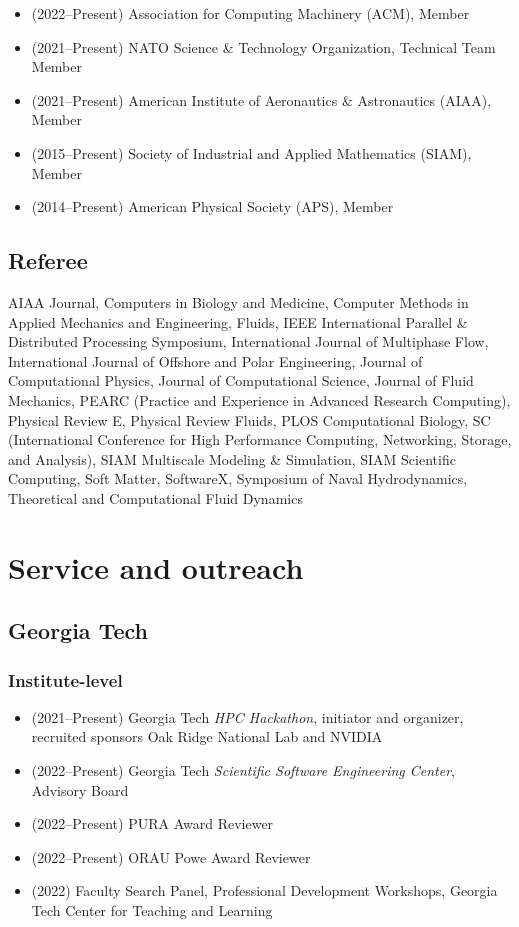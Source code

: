 \begin{itemize}
    \item (2022--Present) Association for Computing Machinery (ACM), Member
    \item (2021--Present) NATO Science \& Technology Organization, Technical Team Member
    \item (2021--Present) American Institute of Aeronautics \& Astronautics (AIAA), Member
    \item (2015--Present) Society of Industrial and Applied Mathematics (SIAM), Member
    \item (2014--Present) American Physical Society (APS), Member
\end{itemize}

\subsection{Referee}

AIAA Journal,
Computers in Biology and Medicine,
Computer Methods in Applied Mechanics and Engineering,
Fluids,
IEEE International Parallel \& Distributed Processing Symposium,
International Journal of Multiphase Flow,
International Journal of Offshore and Polar Engineering,
Journal of Computational Physics,
Journal of Computational Science,
Journal of Fluid Mechanics,
PEARC (Practice and Experience in Advanced Research Computing),
Physical Review E,
Physical Review Fluids,
PLOS Computational Biology,
SC (International Conference for High Performance Computing, Networking, Storage, and Analysis),
SIAM Multiscale Modeling \& Simulation,
SIAM Scientific Computing,
Soft Matter,
SoftwareX,
Symposium of Naval Hydrodynamics,
Theoretical and Computational Fluid Dynamics

\section{Service and outreach}

\subsection{Georgia Tech}

\subsubsection{Institute-level}

\begin{itemize}
    \item (2021--Present) Georgia Tech \textit{HPC Hackathon}, initiator and organizer, recruited sponsors Oak Ridge National Lab and NVIDIA 
    \item (2022--Present) Georgia Tech \textit{Scientific Software Engineering Center}, Advisory Board
    \item (2022--Present) PURA Award Reviewer
    \item (2022--Present) ORAU Powe Award Reviewer
    \item (2022) Faculty Search Panel, Professional Development Workshops, Georgia Tech Center for Teaching and Learning
\end{itemize}

